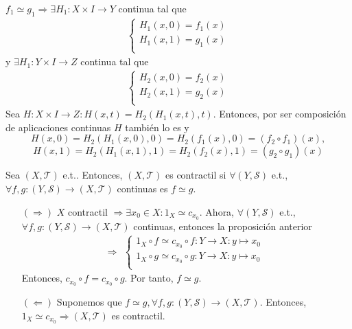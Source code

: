 \begin{dem}
  $f_{1} \simeq g_{1} \Rightarrow \exists H_{1} : X \times I \to Y$ continua tal que
  \[ 
    \begin{aligned}
      \begin{cases}
        H_{1}(x, 0) = f_{1}(x) \\
        H_{1}(x, 1) = g_{1}(x) \\
      \end{cases}
    \end{aligned} 
  \] 
  y $\exists H_{1} : Y \times I \to Z$ continua tal que
  \[ 
    \begin{aligned}
      \begin{cases}
        H_{2}(x, 0) = f_{2}(x) \\
        H_{2}(x, 1) = g_{2}(x) \\
      \end{cases}
    \end{aligned} 
  \] 
  Sea $H : X \times I \to Z : H(x, t) = H_{2}(H_{1}(x, t), t)$. Entonces, por ser composición de aplicaciones continuas $H$ también lo es y
  \[ 
    H(x, 0) = H_{2}(H_{1}(x, 0), 0) = H_{2}(f_{1}(x), 0) = (f_{2} \circ f_{1})(x),
  \] 
  \[ 
    H(x, 1) = H_{2}(H_{1}(x, 1), 1) = H_{2}(f_{2}(x), 1) = (g_{2} \circ g_{1})(x) 
  \] 
\end{dem}

\begin{prop}
  Sea $( X, \mathcal{T} )$ e.t.. Entonces, $( X, \mathcal{T} )$ es contractil si $\forall ( Y, \mathcal{S} )$ e.t., $\forall f,g : ( Y, \mathcal{S} ) \to ( X, \mathcal{T} )$ continuas es $f \simeq g$.
\end{prop}

\begin{dem}
  \begin{enumerate}[label=(\roman*)]
    \item []
    \item [$(\Rightarrow)$] $X$ contractil $\Rightarrow \exists x_{0} \in X : 1_{X} \simeq c_{x_{0}}$. Ahora, $\forall ( Y, \mathcal{S} )$ e.t., $\forall f,g : ( Y, \mathcal{S} ) \to ( X, \mathcal{T} )$ continuas, entonces la proposición anterior
      \[ 
        \Rightarrow 
        \begin{aligned}
          \begin{cases}
            1_{X} \circ f \simeq c_{x_{0}} \circ f : Y \to X : y \mapsto x_{0} \\
            1_{X} \circ g \simeq c_{x_{0}} \circ g : Y \to X : y \mapsto x_{0} \\
          \end{cases}
        \end{aligned} 
      \] 
      Entonces, $c_{x_{0}} \circ f = c_{x_{0}} \circ g$. Por tanto, $f \simeq g$.

    \item [$(\Leftarrow)$] Suponemos que $f \simeq g, \forall f,g : ( Y, \mathcal{S} ) \to ( X, \mathcal{T} )$. Entonces, $1_{X} \simeq c_{x_{0}} \Rightarrow ( X, \mathcal{T} )$ es contractil.
  \end{enumerate}
\end{dem}

